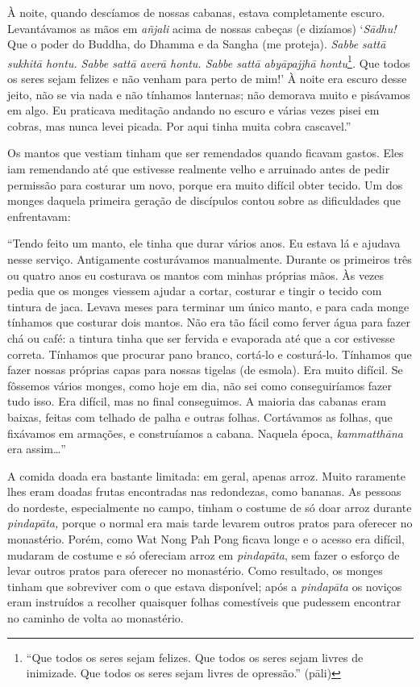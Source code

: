 À noite, quando descíamos de nossas cabanas, estava completamente
escuro. Levantávamos as mãos em \emph{añjali} acima de nossas cabeças (e
dizíamos) `\emph{Sādhu!} Que o poder do Buddha, do Dhamma e da Sangha
(me proteja). \emph{Sabbe sattā sukhitā hontu. Sabbe sattā averā hontu.
Sabbe sattā abyāpajjhā hontu}\footnote{``Que todos os seres sejam
  felizes. Que todos os seres sejam livres de inimizade. Que todos os
  seres sejam livres de opressão.'' (pāli)}\emph{.} Que todos os seres
sejam felizes e não venham para perto de mim!' À noite era escuro desse
jeito, não se via nada e não tínhamos lanternas; não demorava muito e
pisávamos em algo. Eu praticava meditação andando no escuro e várias
vezes pisei em cobras, mas nunca levei picada. Por aqui tinha muita
cobra cascavel.''

Os mantos que vestiam tinham que ser remendados quando ficavam gastos.
Eles iam remendando até que estivesse realmente velho e arruinado antes
de pedir permissão para costurar um novo, porque era muito difícil obter
tecido. Um dos monges daquela primeira geração de discípulos contou
sobre as dificuldades que enfrentavam:

``Tendo feito um manto, ele tinha que durar vários anos. Eu estava lá e
ajudava nesse serviço. Antigamente costurávamos manualmente. Durante os
primeiros três ou quatro anos eu costurava os mantos com minhas próprias
mãos. Às vezes pedia que os monges viessem ajudar a cortar, costurar e
tingir o tecido com tintura de jaca. Levava meses para terminar um único
manto, e para cada monge tínhamos que costurar dois mantos. Não era tão
fácil como ferver água para fazer chá ou café: a tintura tinha que ser
fervida e evaporada até que a cor estivesse correta. Tínhamos que
procurar pano branco, cortá-lo e costurá-lo. Tínhamos que fazer nossas
próprias capas para nossas tigelas (de esmola). Era muito difícil. Se
fôssemos vários monges, como hoje em dia, não sei como conseguiríamos
fazer tudo isso. Era difícil, mas no final conseguimos. A maioria das
cabanas eram baixas, feitas com telhado de palha e outras folhas.
Cortávamos as folhas, que fixávamos em armações, e construíamos a
cabana. Naquela época, \emph{kammatthāna} era assim\ldots{}''

A comida doada era bastante limitada: em geral, apenas arroz. Muito
raramente lhes eram doadas frutas encontradas nas redondezas, como
bananas. As pessoas do nordeste, especialmente no campo, tinham o
costume de só doar arroz durante \emph{pindapāta,} porque o normal era
mais tarde levarem outros pratos para oferecer no monastério. Porém,
como Wat Nong Pah Pong ficava longe e o acesso era difícil, mudaram de
costume e só ofereciam arroz em \emph{pindapāta}, sem fazer o esforço de
levar outros pratos para oferecer no monastério. Como resultado, os
monges tinham que sobreviver com o que estava disponível; após a
\emph{pindapāta} os noviços eram instruídos a recolher quaisquer folhas
comestíveis que pudessem encontrar no caminho de volta ao monastério.

